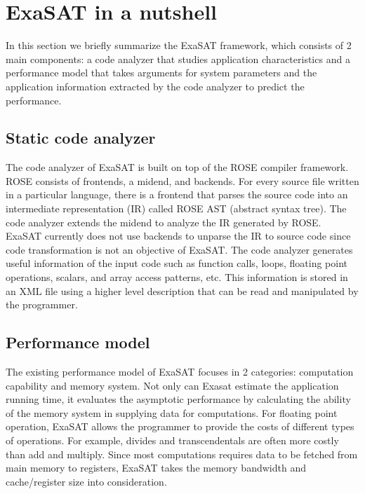 \documentclass{article}
\begin{document}
\section{ExaSAT in a nutshell}
In this section we briefly summarize the ExaSAT framework, which consists of 2 main components: a code analyzer that studies application characteristics and a performance model that takes arguments for system parameters and the application information extracted by the code analyzer to predict the performance.

\subsection{Static code analyzer}
The code analyzer of ExaSAT is built on top of the ROSE compiler framework.
ROSE consists of frontends, a midend, and backends.
For every source file written in a particular language, there is a frontend that parses the source code into an intermediate representation (IR) called ROSE AST (abstract syntax tree).
The code analyzer extends the midend to analyze the IR generated by ROSE.
ExaSAT currently does not use backends to unparse the IR to source code since code transformation is not an objective of ExaSAT. 
The code analyzer generates useful information of the input code such as function calls, loops, floating point operations, scalars, and array access patterns, etc.
This information is stored in an XML file using a higher level description that can be read and manipulated by the programmer.

\subsection{Performance model}
The existing performance model of ExaSAT focuses in 2 categories: computation capability and memory system. 
Not only can Exasat estimate the application running time, it evaluates the asymptotic performance by calculating the ability of the memory system in supplying data for computations. 
For floating point operation, ExaSAT allows the programmer to provide the costs of different types of operations. 
For example, divides and transcendentals are often more costly than add and multiply.
Since most computations requires data to be fetched from main memory to registers, ExaSAT takes the memory bandwidth and cache/register size into consideration.
\end{document}
